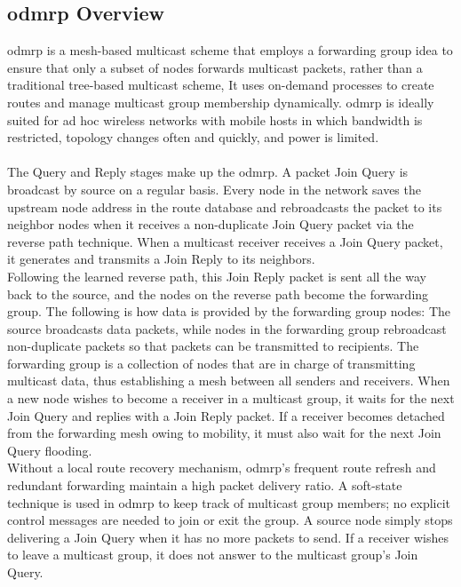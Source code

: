 \subsection{\acrshort{odmrp} Overview}
\acrshort{odmrp} is a mesh-based multicast scheme that employs a forwarding group idea to ensure that only a subset of nodes forwards multicast packets, rather than a traditional tree-based multicast scheme, It uses on-demand processes to create routes and manage multicast group membership dynamically.
\acrshort{odmrp} is ideally suited for ad hoc wireless networks with mobile hosts in which bandwidth is restricted, topology changes often and quickly, and power is limited.
\\
\\
The Query and Reply stages make up the \acrshort{odmrp}.
A packet Join Query is broadcast by source on a regular basis.
Every node in the network saves the upstream node address in the route database and rebroadcasts the packet to its neighbor nodes when it receives a non-duplicate Join Query packet via the reverse path technique.
When a multicast receiver receives a Join Query packet, it generates and transmits a Join Reply to its neighbors.
\\
Following the learned reverse path, this Join Reply packet is sent all the way back to the source, and the nodes on the reverse path become the forwarding group.
The following is how data is provided by the forwarding group nodes:
The source broadcasts data packets, while nodes in the forwarding group rebroadcast non-duplicate packets so that packets can be transmitted to recipients.
The forwarding group is a collection of nodes that are in charge of transmitting multicast data, thus establishing a mesh between all senders and receivers.
When a new node wishes to become a receiver in a multicast group, it waits for the next Join Query and replies with a Join Reply packet.
If a receiver becomes detached from the forwarding mesh owing to mobility, it must also wait for the next Join Query flooding.
\\
Without a local route recovery mechanism, \acrshort{odmrp}'s frequent route refresh and redundant forwarding maintain a high packet delivery ratio.
A soft-state technique is used in \acrshort{odmrp} to keep track of multicast group members; no explicit control messages are needed to join or exit the group.
A source node simply stops delivering a Join Query when it has no more packets to send.
If a receiver wishes to leave a multicast group, it does not answer to the multicast group's Join Query.
